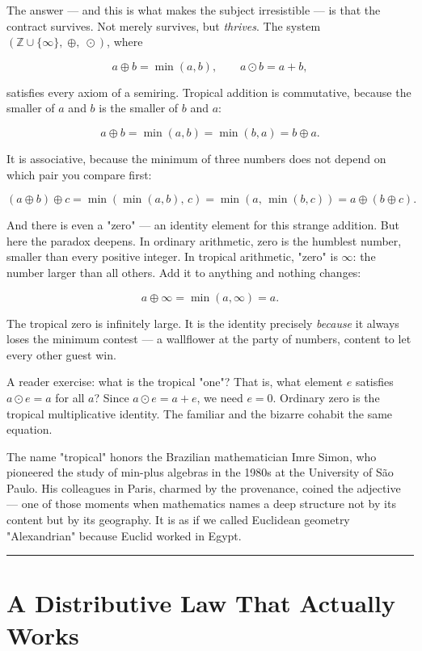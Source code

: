 \documentclass[12pt, letterpaper, openany]{book}
\theoremstyle{definition}
\theoremstyle{remark}
\begin{document}
The answer --- and this is what makes the subject irresistible --- is that the contract survives. Not merely survives, but \textit{thrives}. The system $(\mathbb{Z} \cup \{\infty\},\; \oplus,\; \odot)$, where

\[
a \oplus b = \min(a, b), \qquad a \odot b = a + b,
\]

satisfies every axiom of a semiring. Tropical addition is commutative, because the smaller of $a$ and $b$ is the smaller of $b$ and $a$:

\[
a \oplus b = \min(a,b) = \min(b,a) = b \oplus a.
\]

It is associative, because the minimum of three numbers does not depend on which pair you compare first:

\[
(a \oplus b) \oplus c = \min(\min(a,b),\, c) = \min(a,\, \min(b,c)) = a \oplus (b \oplus c).
\]

And there is even a "zero" --- an identity element for this strange addition. But here the paradox deepens. In ordinary arithmetic, zero is the humblest number, smaller than every positive integer. In tropical arithmetic, "zero" is $\infty$: the number larger than all others. Add it to anything and nothing changes:

\[
a \oplus \infty = \min(a, \infty) = a.
\]

The tropical zero is infinitely large. It is the identity precisely \textit{because} it always loses the minimum contest --- a wallflower at the party of numbers, content to let every other guest win.

A reader exercise: what is the tropical "one"? That is, what element $e$ satisfies $a \odot e = a$ for all $a$? Since $a \odot e = a + e$, we need $e = 0$. Ordinary zero is the tropical multiplicative identity. The familiar and the bizarre cohabit the same equation.

The name "tropical" honors the Brazilian mathematician Imre Simon, who pioneered the study of min-plus algebras in the 1980s at the University of São Paulo. His colleagues in Paris, charmed by the provenance, coined the adjective --- one of those moments when mathematics names a deep structure not by its content but by its geography. It is as if we called Euclidean geometry "Alexandrian" because Euclid worked in Egypt.


\bigskip\noindent\rule{\textwidth}{0.4pt}\bigskip



\section*{A Distributive Law That Actually Works}
\end{document}

